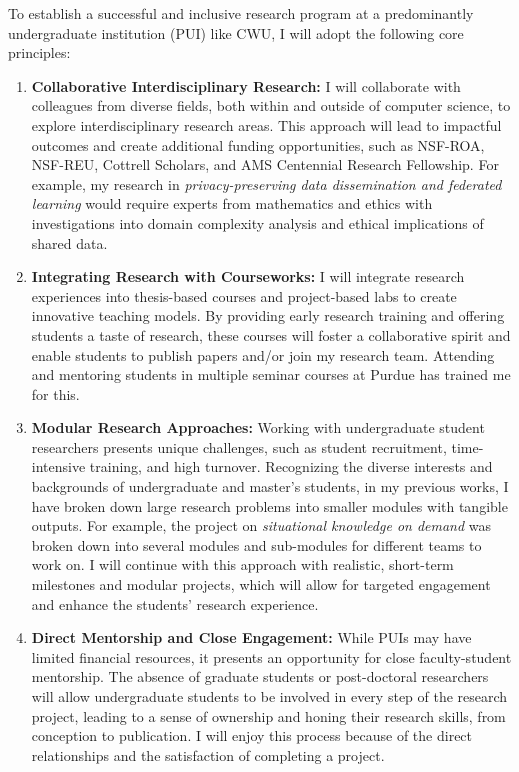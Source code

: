 To establish a successful and inclusive research program at a predominantly undergraduate institution (PUI) like CWU, I will adopt the following core principles:

\begin{enumerate}[label=(\arabic*),topsep=0pt, leftmargin=0pt,nosep]
    \item \textbf{Collaborative Interdisciplinary Research:} I will collaborate with colleagues from diverse fields, both within and outside of \shortInstitutionName{} computer science, to explore interdisciplinary research areas. This approach will lead to impactful outcomes and create additional funding opportunities, such as NSF-ROA, NSF-REU, Cottrell Scholars, and AMS Centennial Research Fellowship. For example, my research in \textit{privacy-preserving data dissemination and federated learning} would require experts from mathematics and ethics with investigations into domain complexity analysis and ethical implications of shared data. 

    \item\textbf{Integrating Research with Courseworks:} I will integrate research experiences into thesis-based courses and project-based labs to create innovative teaching models. By providing early research training and offering students a taste of research, these courses will foster a collaborative spirit and enable students to publish papers and/or join my research team. 
    Attending and mentoring students in multiple seminar courses at Purdue has trained me for this.

    \item \textbf{Modular Research Approaches:} Working with undergraduate student researchers presents unique challenges, such as student recruitment, time-intensive training, and high turnover. Recognizing the diverse interests and backgrounds of undergraduate and master's students, in my previous works, I have broken down large research problems into smaller modules with tangible outputs. For example, the project on \textit{situational knowledge on demand} was broken down into several modules and sub-modules for different teams to work on. I will continue with this approach with realistic, short-term milestones and modular projects, which will allow for targeted engagement and enhance the students' research experience. 

    \item \textbf{Direct Mentorship and Close Engagement:} While PUIs may have limited financial resources, it presents an opportunity for close faculty-student mentorship. The absence of graduate students or post-doctoral researchers will allow undergraduate students to be involved in every step of the research project, leading to a sense of ownership and honing their research skills, from conception to publication. I will enjoy this process because of the direct relationships and the satisfaction of completing a project.


\end{enumerate}
